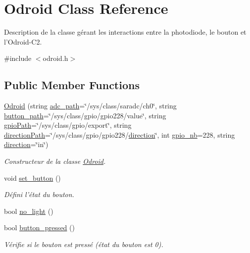 \hypertarget{classOdroid}{\section{Odroid Class Reference}
\label{classOdroid}
}


Description de la classe gérant les interactions entre la photodiode, le bouton et l'Odroid-\/\-C2.  




{\ttfamily \#include $<$odroid.\-h$>$}

\subsection*{Public Member Functions}
\begin{DoxyCompactItemize}
\item 
\hyperlink{classOdroid_af78c1d11b6bc3e0a9b206e9f90787bf6}{Odroid} (string \hyperlink{classOdroid_a93391450090b2f8676e261bb6f8ac961}{adc\-\_\-path}=\char`\"{}/sys/class/saradc/ch0\char`\"{}, string \hyperlink{classOdroid_af5c8c0acd24f1d38ae2181a4d659ecd8}{button\-\_\-path}=\char`\"{}/sys/class/gpio/gpio228/value\char`\"{}, string \hyperlink{classOdroid_af59f177765cdc44dd1bca01f1d2e568c}{gpio\-Path}=\char`\"{}/sys/class/gpio/export\char`\"{}, string \hyperlink{classOdroid_aa74658114a7f7d6d31dba4b7e7955674}{direction\-Path}=\char`\"{}/sys/class/gpio/gpio228/\hyperlink{classOdroid_acb053e5e5f9060d7884abf6dd6c29358}{direction}\char`\"{}, int \hyperlink{classOdroid_a936074d84ad18c34e19ee1f1ea59fcbf}{gpio\-\_\-nb}=228, string \hyperlink{classOdroid_acb053e5e5f9060d7884abf6dd6c29358}{direction}=\char`\"{}in\char`\"{})
\begin{DoxyCompactList}\small\item\em Constructeur de la classe \hyperlink{classOdroid}{Odroid}. \end{DoxyCompactList}\item 
void \hyperlink{classOdroid_afda2e858ec376bd9f0b29fdb7f0f9bb7}{set\-\_\-button} ()
\begin{DoxyCompactList}\small\item\em Défini l'état du bouton. \end{DoxyCompactList}\item 
bool \hyperlink{classOdroid_a13964668cb1c0d36ffaaeca6a819a83e}{no\-\_\-light} ()
\item 
bool \hyperlink{classOdroid_aa2c13144f4a17627be568b53d8589c58}{button\-\_\-pressed} ()
\begin{DoxyCompactList}\small\item\em Vérifie si le bouton est pressé (état du bouton est 0). \end{DoxyCompactList}\end{DoxyCompactItemize}
